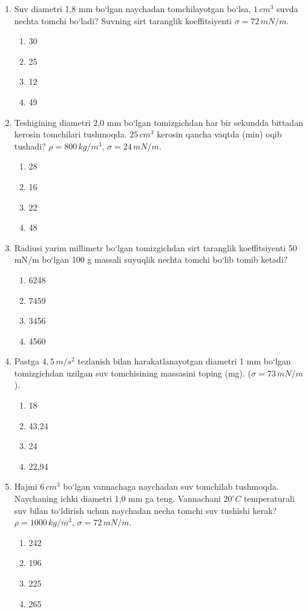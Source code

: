 \begin{enumerate}
\item Suv diametri 1,8 mm bo‘lgan naychadan tomchilayotgan bo‘lsa, $1 \, cm^3$ suvda nechta tomchi bo‘ladi? Suvning sirt taranglik koeffitsiyenti $\sigma = 72 \, mN/m$.
\begin{enumerate}[label=\Alph*)]
\item 30
\item 25
\item 12
\item 49
\end{enumerate}

\item Teshigining diametri 2,0 mm bo‘lgan tomizgichdan har bir sekundda bittadan kerosin tomchilari tushmoqda. $25 \, cm^3$ kerosin qancha vaqtda (min) oqib tushadi? $\rho = 800 \, kg/m^3$, $\sigma = 24 \, mN/m$.
\begin{enumerate}[label=\Alph*)]
\item 28
\item 16
\item 22
\item 48
\end{enumerate}

\item Radiusi yarim millimetr bo‘lgan tomizgichdan sirt taranglik koeffitsiyenti 50 mN/m bo‘lgan 100 g massali suyuqlik nechta tomchi bo‘lib tomib ketadi?
\begin{enumerate}[label=\Alph*)]
\item 6248
\item 7459
\item 3456
\item 4560
\end{enumerate}

\item Pastga $4,5 \, m/s^2$ tezlanish bilan harakatlanayotgan diametri 1 mm bo‘lgan tomizgichdan uzilgan suv tomchisining massasini toping (mg). ($\sigma = 73 \, mN/m$).
\begin{enumerate}[label=\Alph*)]
\item 18
\item 43,24
\item 24
\item 22,94
\end{enumerate}

\item Hajmi $6 \, cm^3$ bo‘lgan vannachaga naychadan suv tomchilab tushmoqda. Naychaning ichki diametri 1,0 mm ga teng. Vannachani $20^\circ C$ temperaturali suv bilan to‘ldirish uchun naychadan necha tomchi suv tushishi kerak? $\rho = 1000 \, kg/m^3$, $\sigma = 72 \, mN/m$.
\begin{enumerate}[label=\Alph*)]
\item 242
\item 196
\item 225
\item 265
\end{enumerate}


\end{enumerate}
